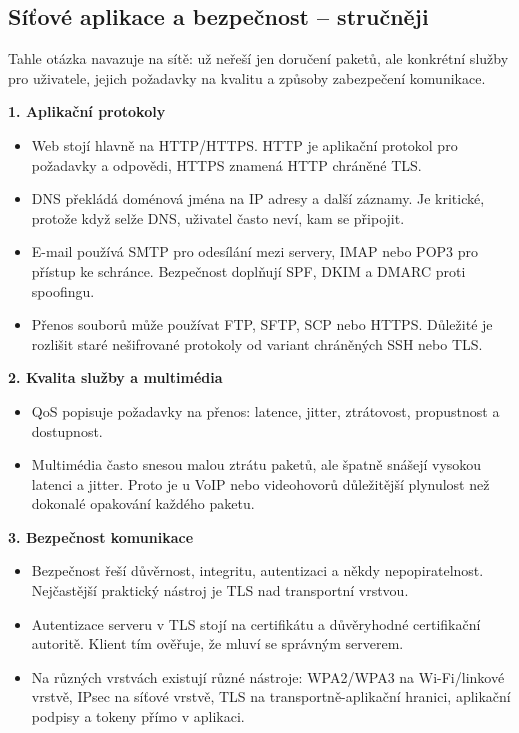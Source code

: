 \newpage

\subsection*{Síťové aplikace a bezpečnost -- stručněji}
Tahle otázka navazuje na sítě: už neřeší jen doručení paketů, ale konkrétní služby pro uživatele, jejich požadavky na kvalitu a způsoby zabezpečení komunikace.

\textbf{1. Aplikační protokoly}
\begin{itemize}
  \item Web stojí hlavně na HTTP/HTTPS. HTTP je aplikační protokol pro požadavky a odpovědi, HTTPS znamená HTTP chráněné TLS.
  \item DNS překládá doménová jména na IP adresy a další záznamy. Je kritické, protože když selže DNS, uživatel často neví, kam se připojit.
  \item E-mail používá SMTP pro odesílání mezi servery, IMAP nebo POP3 pro přístup ke schránce. Bezpečnost doplňují SPF, DKIM a DMARC proti spoofingu.
  \item Přenos souborů může používat FTP, SFTP, SCP nebo HTTPS. Důležité je rozlišit staré nešifrované protokoly od variant chráněných SSH nebo TLS.
\end{itemize}

\textbf{2. Kvalita služby a multimédia}
\begin{itemize}
  \item QoS popisuje požadavky na přenos: latence, jitter, ztrátovost, propustnost a dostupnost.
  \item Multimédia často snesou malou ztrátu paketů, ale špatně snášejí vysokou latenci a jitter. Proto je u VoIP nebo videohovorů důležitější plynulost než dokonalé opakování každého paketu.
\end{itemize}

\textbf{3. Bezpečnost komunikace}
\begin{itemize}
  \item Bezpečnost řeší důvěrnost, integritu, autentizaci a někdy nepopiratelnost. Nejčastější praktický nástroj je TLS nad transportní vrstvou.
  \item Autentizace serveru v TLS stojí na certifikátu a důvěryhodné certifikační autoritě. Klient tím ověřuje, že mluví se správným serverem.
  \item Na různých vrstvách existují různé nástroje: WPA2/WPA3 na Wi-Fi/linkové vrstvě, IPsec na síťové vrstvě, TLS na transportně-aplikační hranici, aplikační podpisy a tokeny přímo v aplikaci.
\end{itemize}

